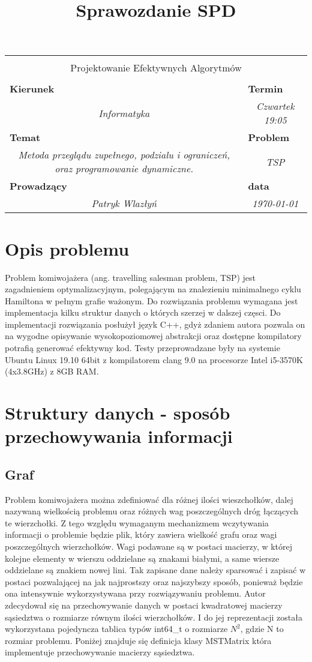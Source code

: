 \documentclass[polish,polish,a4paper]{article}
\title{Sprawozdanie SPD}
\newcommand{\name}[1]{\sffamily\bfseries\scriptsize #1}
\newcommand{\frontpage}[8]{

\vspace{2cm}

\begin{tabular}{|p{0.72\textwidth}|p{0.28\textwidth}|}
\hline
\multicolumn{2}{|c|}{}\\
\multicolumn{2}{|c|}{{\LARGE #1}}\\
\multicolumn{2}{|c|}{}\\
\hline
\name{Kierunek} & \name{Termin}\\
\multicolumn{1}{|c|}{\textit{#2}} & \multicolumn{1}{|c|}{\textit{#3}} \\
\hline
\name{Temat} & \name{Problem}\\
\multicolumn{1}{|c|}{\textit{#4}} & \multicolumn{1}{|c|}{\textit{#5}} \\
\hline
\name{Prowadzący} & \name{data}\\
\multicolumn{1}{|c|}{\textit{Patryk Wlazłyń}} & \multicolumn{1}{|c|}{\textit{#6}} \\
\hline
\end{tabular}

}
\begin{document}
\frontpage{Projektowanie Efektywnych Algorytmów}{Informatyka}{Czwartek 19:05}{Metoda przeglądu zupełnego, podzialu i ograniczeń, oraz programowanie dynamiczne.}{TSP}{\today}
\pagestyle{empty}
\newpage

\section{Opis problemu}

Problem komiwojażera (ang. travelling salesman problem, TSP) jest zagadnieniem optymalizacyjnym, polegającym na znalezieniu minimalnego cyklu Hamiltona w pełnym grafie ważonym\cite{TSPWiki:1}. Do rozwiązania problemu wymagana jest implementacja kilku struktur danych o których szerzej w dalszej częsci.
Do implementacji rozwiązania posłużył język C++, gdyż zdaniem autora pozwala on na wygodne opisywanie wysokopoziomowej abstrakcji oraz dostępne kompilatory
potrafią generować efektywny kod. Testy przeprowadzane były na systemie Ubuntu Linux 19.10 64bit z kompilatorem clang 9.0 na procesorze Intel i5-3570K (4x3.8GHz) z 8GB RAM.

\section{Struktury danych - sposób przechowywania informacji}

\subsection{Graf}

Problem komiwojażera można zdefiniować dla różnej ilości wieszchołków, dalej nazywaną wielkością problemu oraz różnych wag poszczególnych dróg łączących te wierzchołki.
Z tego względu wymaganym mechanizmem wczytywania informacji o problemie będzie plik, który zawiera wielkość grafu oraz wagi poszczególnych wierzchołków.
Wagi podawane są w postaci macierzy, w której kolejne elementy w wierszu oddzielane są znakami białymi, a same wiersze oddzielane są znakiem nowej lini.
Tak zapisane dane należy sparsować i zapisać w postaci pozwalającej na jak najprostszy oraz najszybszy sposób, ponieważ będzie ona intensywnie wykorzystywana przy rozwiązywaniu problemu.
Autor zdecydował się na przechowywanie danych w postaci kwadratowej macierzy sąsiedztwa o rozmiarze równym ilości wierzchołków.
I do jej reprezentacji została wykorzystana pojedyncza tablica typów int64\_t o rozmiarze $N^{2}$, gdzie N to rozmiar problemu.
Poniżej znajduje się definicja klasy MSTMatrix która implementuje przechowywanie macierzy sąsiedztwa.
\end{document}
